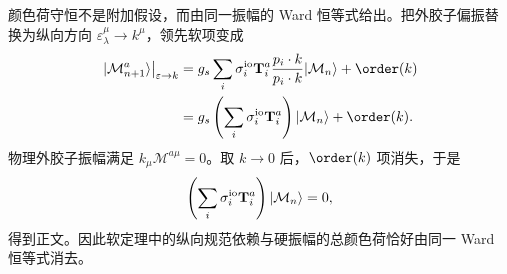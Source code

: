 \begin{derivation}[软胶子发射与颜色荷守恒]
颜色荷守恒不是附加假设，而由同一振幅的 Ward 恒等式给出。把外胶子偏振替换为纵向方向 $\varepsilon_\lambda^\mu\to k^\mu$，领先软项变成
\begin{align*}
 \left.|\mathcal M_{n+1}^{a}\rangle\right|_{\varepsilon\to k}
 &=g_s\sum_i\sigma_i^{\rm io}\mathbf T_i^a
 \frac{p_i\cdot k}{p_i\cdot k}|\mathcal M_n\rangle+\order(k)\\
 &=g_s\left(\sum_i\sigma_i^{\rm io}\mathbf T_i^a\right)|\mathcal M_n\rangle+\order(k).
\end{align*}
物理外胶子振幅满足 $k_\mu\mathcal M^{a\mu}=0$。取 $k\to0$ 后，$\order(k)$ 项消失，于是
\begin{equation*}
 \left(\sum_i\sigma_i^{\rm io}\mathbf T_i^a\right)|\mathcal M_n\rangle=0,
\end{equation*}
得到正文。因此软定理中的纵向规范依赖与硬振幅的总颜色荷恰好由同一 Ward 恒等式消去。
\end{derivation}

